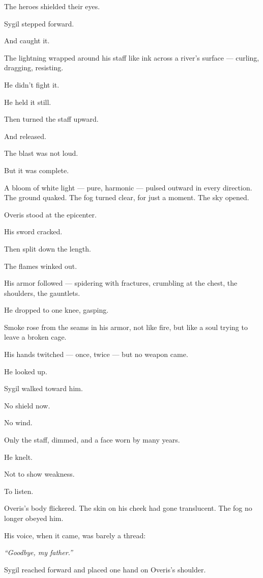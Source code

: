 \documentclass[9pt]{article}
\begin{document}
The heroes shielded their eyes.

Sygil stepped forward.

And caught it.

The lightning wrapped around his staff like ink across a river’s surface — curling, dragging, resisting.

He didn’t fight it.

He held it still.

Then turned the staff upward.

And released.

\bigskip

The blast was not loud.

But it was complete.

A bloom of white light — pure, harmonic — pulsed outward in every direction. The ground quaked. The fog turned clear, for just a moment. The sky opened.

Overis stood at the epicenter.

His sword cracked.

Then split down the length.

The flames winked out.

His armor followed — spidering with fractures, crumbling at the chest, the shoulders, the gauntlets.

He dropped to one knee, gasping.

Smoke rose from the seams in his armor, not like fire, but like a soul trying to leave a broken cage.

His hands twitched — once, twice — but no weapon came.

He looked up.

Sygil walked toward him.

No shield now.

No wind.

Only the staff, dimmed, and a face worn by many years.

He knelt.

Not to show weakness.

To listen.

Overis’s body flickered. The skin on his cheek had gone translucent. The fog no longer obeyed him.

His voice, when it came, was barely a thread:

\textit{“Goodbye, my father.”}

\bigskip

Sygil reached forward and placed one hand on Overis’s shoulder.
\end{document}
